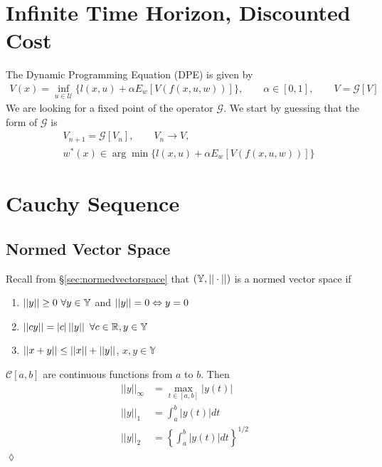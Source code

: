 \mainmatter%
\setcounter{page}{1}

\lectureseries[\course]{\course}

\date{October 20, 2009}

\setaddress%

\setcounter{lecture}{6}
\setcounter{chapter}{6}


\section{Infinite Time Horizon, Discounted Cost}
The Dynamic Programming Equation (DPE) is given by
\begin{align*}
V(x) = \inf_{u\in\mathcal{U}}\{l(x,u)+\alpha E_w[V(f(x,u,w))]\}, \qquad \alpha\in[0,1], \qquad V = \mathcal{G}[V]
\end{align*}
We are looking for a fixed point of the operator $\mathcal{G}$.
We start by guessing that the form of $\mathcal{G}$ is
\begin{align*}
&V_{n+1} = \mathcal{G}[V_n], \qquad V_n\to V, \\
&w^\ast(x) \in \arg\min\{l(x,u)+\alpha E_w[V(f(x,u,w))]\}
\end{align*}

\section{Cauchy Sequence}
\subsection{Normed Vector Space}
Recall from \S\ref{sec:normedvectorspace} that $(\mathbb{Y},||\cdot||)$ is a normed vector space if
\begin{enumerate}
\item $\left|\left|y\right|\right|\geq0~\forall y\in\mathbb{Y}$ and $\left|\left|y\right|\right|=0\Leftrightarrow y=0$
\item $||cy|| = |c|\left|\left|y\right|\right|~\forall c\in\mathbb{R}, y\in\mathbb{Y}$
\item $\left|\left|x+y\right|\right|\leq ||x|| + ||y||$, $x,y\in\mathbb{Y}$
\end{enumerate}

\begin{example}
$\mathcal{C}[a,b]$ are continuous functions from $a$ to $b$.
Then
\begin{align*}
||y||_\infty &= \max_{t\in[a,b]}|y(t)| \\
||y||_1 &= \int_a^b|y(t)|dt \\
||y||_2 &= \left\lbrace\int_a^b|y(t)|dt\right\rbrace^{1/2}
\end{align*}
$\lozenge$
\end{example}

